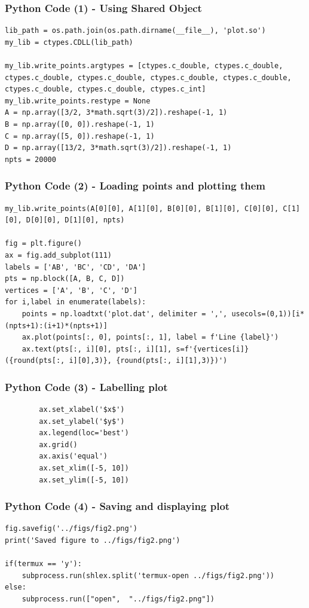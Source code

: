 \documentclass{beamer}
\begin{document}
\begin{frame}[fragile]
    \frametitle{Python Code (1) - Using Shared Object}
    \begin{lstlisting}
lib_path = os.path.join(os.path.dirname(__file__), 'plot.so')
my_lib = ctypes.CDLL(lib_path)

my_lib.write_points.argtypes = [ctypes.c_double, ctypes.c_double, ctypes.c_double, ctypes.c_double, ctypes.c_double, ctypes.c_double, ctypes.c_double, ctypes.c_double, ctypes.c_int]
my_lib.write_points.restype = None
A = np.array([3/2, 3*math.sqrt(3)/2]).reshape(-1, 1)
B = np.array([0, 0]).reshape(-1, 1)
C = np.array([5, 0]).reshape(-1, 1)
D = np.array([13/2, 3*math.sqrt(3)/2]).reshape(-1, 1)
npts = 20000
\end{lstlisting}
\end{frame}

\begin{frame}[fragile]
    \frametitle{Python Code (2) - Loading points and plotting them}
    \begin{lstlisting}
my_lib.write_points(A[0][0], A[1][0], B[0][0], B[1][0], C[0][0], C[1][0], D[0][0], D[1][0], npts)

fig = plt.figure()
ax = fig.add_subplot(111)
labels = ['AB', 'BC', 'CD', 'DA']
pts = np.block([A, B, C, D])
vertices = ['A', 'B', 'C', 'D']
for i,label in enumerate(labels):
    points = np.loadtxt('plot.dat', delimiter = ',', usecols=(0,1))[i*(npts+1):(i+1)*(npts+1)]
    ax.plot(points[:, 0], points[:, 1], label = f'Line {label}')
    ax.text(pts[:, i][0], pts[:, i][1], s=f'{vertices[i]}({round(pts[:, i][0],3)}, {round(pts[:, i][1],3)})')
\end{lstlisting}
\end{frame}

\begin{frame}[fragile]
    \frametitle{Python Code (3) - Labelling plot}
    \begin{lstlisting}
        ax.set_xlabel('$x$')
        ax.set_ylabel('$y$')
        ax.legend(loc='best')
        ax.grid() 
        ax.axis('equal')
        ax.set_xlim([-5, 10])
        ax.set_ylim([-5, 10])
    \end{lstlisting}
\end{frame}

\begin{frame}[fragile]
    \frametitle{Python Code (4) - Saving and displaying plot}
    \begin{lstlisting}
fig.savefig('../figs/fig2.png')
print('Saved figure to ../figs/fig2.png')

if(termux == 'y'):
    subprocess.run(shlex.split('termux-open ../figs/fig2.png'))
else:
    subprocess.run(["open",  "../figs/fig2.png"])
\end{lstlisting}
\end{frame}
\end{document}
